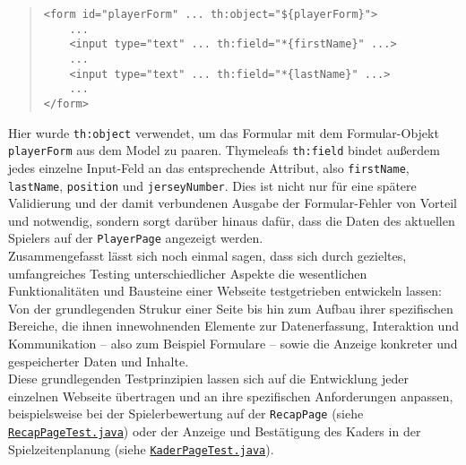\begin{quote}
\begin{verbatim}
<form id="playerForm" ... th:object="${playerForm}">
    ...
    <input type="text" ... th:field="*{firstName}" ...>
    ...
    <input type="text" ... th:field="*{lastName}" ...>
    ...
</form>
\end{verbatim}
\end{quote}

Hier wurde \texttt{th:object} verwendet, um das Formular mit dem Formular-Objekt 
\texttt{playerForm} aus dem Model zu paaren. Thymeleafs \texttt{th:field} bindet 
außerdem jedes einzelne Input-Feld an das entsprechende Attribut, also 
\texttt{firstName}, \texttt{lastName}, \texttt{position} und \texttt{jerseyNumber}. 
Dies ist nicht nur für eine spätere Validierung und der damit verbundenen Ausgabe 
der Formular-Fehler von Vorteil und notwendig, sondern sorgt darüber hinaus dafür, 
dass die Daten des aktuellen Spielers auf der \texttt{PlayerPage} angezeigt 
werden. \\ 
Zusammengefasst lässt sich noch einmal sagen, dass sich durch gezieltes, 
umfangreiches Testing unterschiedlicher Aspekte die wesentlichen Funktionalitäten 
und Bausteine einer Webseite testgetrieben entwickeln lassen: Von der 
grundlegenden Strukur einer Seite bis hin zum Aufbau ihrer spezifischen Bereiche, 
die ihnen innewohnenden Elemente zur Datenerfassung, Interaktion und Kommunikation 
-- also zum Beispiel Formulare -- sowie die Anzeige konkreter und gespeicherter 
Daten und Inhalte. \\ 
Diese grundlegenden Testprinzipien lassen sich auf die Entwicklung jeder einzelnen 
Webseite übertragen und an ihre spezifischen Anforderungen anpassen, 
beispielsweise bei der Spielerbewertung auf der \texttt{RecapPage} (siehe 
\href{https://github.com/FlorianOhmes/bat_spielzeitenplaner/blob/main/spielzeitenplaner/src/test/java/de/bathesis/spielzeitenplaner/templates/recap/RecapPageTest.java}{{\texttt{RecapPageTest.java}}})
oder der Anzeige und Bestätigung des Kaders in der Spielzeitenplanung (siehe 
\href{https://github.com/FlorianOhmes/bat_spielzeitenplaner/blob/main/spielzeitenplaner/src/test/java/de/bathesis/spielzeitenplaner/templates/spielzeiten/KaderPageTest.java}{\texttt{KaderPageTest.java}}). 

